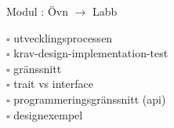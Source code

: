 
Modul : Övn  $\rightarrow$ Labb 
\begin{multicols}{3}\SlideFontTiny
$\square$ utvecklingsprocessen \\
$\square$ krav-design-implementation-test \\
$\square$ gränssnitt \\
$\square$ trait vs interface \\
$\square$ programmeringsgränssnitt (api) \\
$\square$ designexempel \\     
\end{multicols}
